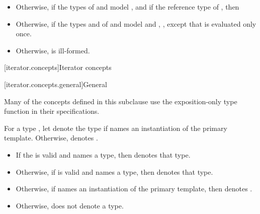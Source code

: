 \begin{addedblock}
\begin{itemize}
\item Otherwise, if the types of  and    model
, and if the reference type of    
,
then 

\item Otherwise, if the types  and  of  and
 model  and
, 
,
except that  is evaluated only once.

\item Otherwise,  is ill-formed.
\end{itemize}

[iterator.concepts]{Iterator concepts}

[iterator.concepts.general]{General}

{\color{oldclr}
\pnum
Many of the concepts defined in this subclause use the
exposition-only type function  in their
specifications.
} %

\pnum
For a type , let  denote the type
 if  names an instantiation of the primary
template. Otherwise,  denotes
.
\begin{itemize}
\item If the 
   is valid
  and names a type, then  denotes that
  type.
\item Otherwise, if 
  is valid and names a type, then 
  denotes that type.
\item Otherwise, if  names an instantiation of
  the primary template, then  denotes
  .
\item Otherwise,  does not denote a type.
\end{itemize}


\end{addedblock}
